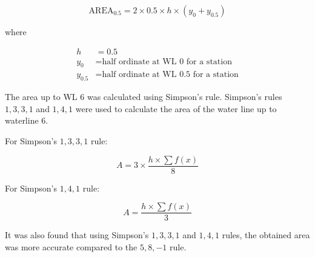 \documentclass[12pt,a4paper,twoside]{report}
\begin{document}
\begin{equation}
\mathrm{AREA}_{0.5}
=
2 \times 0.5 \times h \times (y_0+y_{0.5})
\end{equation}

\vspace{\baselineskip}\par\noindent where

\begin{align*}
h &= 0.5 \\
y_0 &= \text{half ordinate at WL 0 for a station} \\
y_{0.5} &= \text{half ordinate at WL 0.5 for a station}
\end{align*}

\vspace{\baselineskip}\par\noindent The area up to WL 6 was calculated using Simpson's rule.
Simpson's rules $1,3,3,1$ and $1,4,1$ were used to calculate the area
of the water line up to waterline 6.

\vspace{\baselineskip}\par\noindent For Simpson's $1,3,3,1$ rule:

\begin{equation}
A =
3 \times \frac{h \times \sum f(x)}{8}
\end{equation}

\vspace{\baselineskip}\par\noindent For Simpson's $1,4,1$ rule:

\begin{equation}
A =
\frac{h \times \sum f(x)}{3}
\end{equation}

\vspace{\baselineskip}\par\noindent It was also found that using Simpson's $1,3,3,1$ and $1,4,1$ rules,
the obtained area was more accurate compared to the $5,8,-1$ rule.
\end{document}
